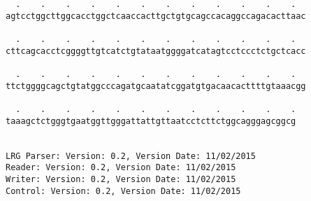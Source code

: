 \documentclass{article}
\begin{document}
\begin{Verbatim}
  .    .    .    .    .    .    .    .    .    .    .    .  
agtcctggcttggcacctggctcaaccacttgctgtgcagccacaggccagacacttaac
                                                            
  .    .    .    .    .    .    .    .    .    .    .    .  
cttcagcacctcggggttgtcatctgtataatggggatcatagtcctccctctgctcacc
                                                            
  .    .    .    .    .    .    .    .    .    .    .    .  
ttctggggcagctgtatggcccagatgcaatatcggatgtgacaacacttttgtaaacgg
                                                            
  .    .    .    .    .    .    .    .    .    .    .    .
taaagctctgggtgaatggttgggattattgttaatcctcttctggcagggagcggcg
                                                          
                                                          
LRG Parser: Version: 0.2, Version Date: 11/02/2015
Reader: Version: 0.2, Version Date: 11/02/2015
Writer: Version: 0.2, Version Date: 11/02/2015
Control: Version: 0.2, Version Date: 11/02/2015
\end{Verbatim}
\end{document}
